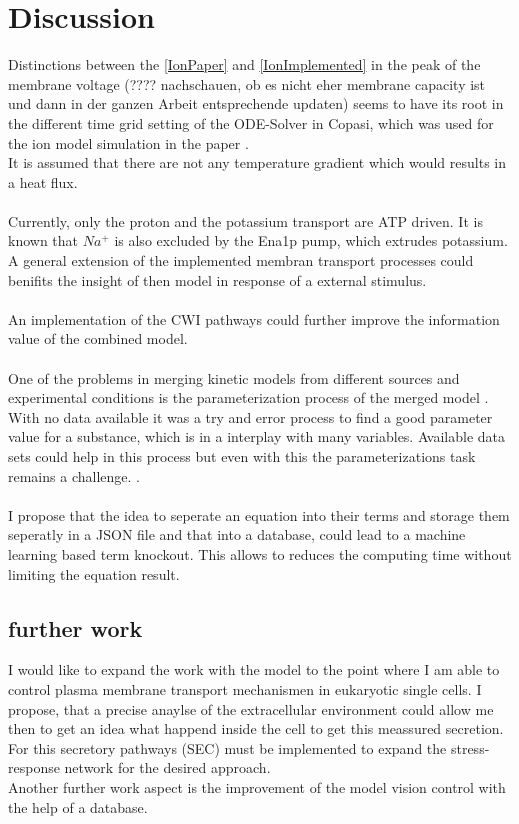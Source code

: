 \section{Discussion}
Distinctions between the \ref{IonPaper} and \ref{IonImplemented} in the peak of the membrane voltage (???? nachschauen, ob es nicht eher membrane capacity ist und dann in der ganzen Arbeit entsprechende updaten) seems to have its root in the different time grid setting of the ODE-Solver in Copasi, which was used for the ion model simulation in the paper \cite{Gerber_2016}.\\
It is assumed that there are not any temperature gradient which would results in a heat flux.\\\\
Currently, only the proton and the potassium transport are ATP driven. It is known that $Na^+$ is also excluded by the Ena1p pump, which extrudes potassium. A general extension of the implemented membran transport processes could benifits the insight of then model in response of a external stimulus.\\\\
An implementation of the CWI pathways could further improve the information value of the combined model.\\\\
One of the problems in merging kinetic models from different sources and experimental conditions is the parameterization process of the merged model \cite{Wang2017}. With no data available it was a try and error process to find a good parameter value for a substance, which is in a interplay with many variables. Available data sets could help in this process but even with this the parameterizations task remains a challenge. \cite{Ke_2013}. \\\\
I propose that the idea to seperate an equation into their terms and storage them seperatly in a JSON file and that into a database, could lead to a machine learning based term knockout. This allows to reduces the computing time without limiting the equation result.\\

\subsection{further work}
I would like to expand the work with the model to the point where I am able to control plasma membrane transport mechanismen in eukaryotic single cells. I propose, that a precise anaylse of the extracellular environment could allow me then to get an idea what happend inside the cell to get this meassured secretion. For this secretory pathways (SEC) must be implemented to expand the stress-response network for the desired approach.\\
Another further work aspect is the improvement of the model vision control with the help of a database.\\\\
